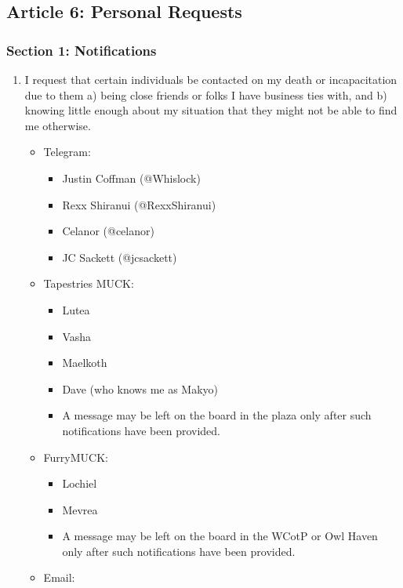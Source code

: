 \hypertarget{article-6-personal-requests}{%
\subsection*{Article 6: Personal Requests}\label{article-6-personal-requests}}

\hypertarget{section-1-notifications}{%
\subsubsection*{Section 1: Notifications}\label{section-1-notifications}}

\begin{enumerate}
\def\labelenumi{\arabic{enumi}.}
\tightlist
\item
  I request that certain individuals be contacted on my death or incapacitation due to them a) being close friends or folks I have business ties with, and b) knowing little enough about my situation that they might not be able to find me otherwise.

  \begin{itemize}
  \tightlist
  \item
    Telegram:

    \begin{itemize}
    \tightlist
    \item
      Justin Coffman (@Whislock)
    \item
      Rexx Shiranui (@RexxShiranui)
    \item
      Celanor (@celanor)
    \item
      JC Sackett (@jcsackett)
    \end{itemize}
  \item
    Tapestries MUCK:

    \begin{itemize}
    \tightlist
    \item
      Lutea
    \item
      Vasha
    \item
      Maelkoth
    \item
      Dave (who knows me as Makyo)
    \item
      A message may be left on the board in the plaza only after such notifications have been provided.
    \end{itemize}
  \item
    FurryMUCK:

    \begin{itemize}
    \tightlist
    \item
      Lochiel
    \item
      Mevrea
    \item
      A message may be left on the board in the WCotP or Owl Haven only after such notifications have been provided.
    \end{itemize}
  \item
    Email:


\end{itemize}
\end{enumerate}
